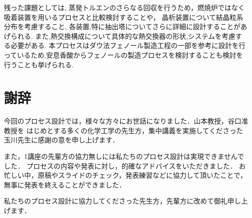 \documentclass[a4j]{jsreport}
\begin{document}
残った課題としては,
蒸発トルエンのさらなる回収を行うため，燃焼炉ではなく吸着装置を用いるプロセスと比較検討することや，
晶析装置について結晶粒系分布を考慮すること,
各装置,特に抽出塔についてさらに詳細に設計することがあげられる.
また,熱交換構成について具体的な熱交換器の形状,システムを考慮する必要がある.
本プロセスはダウ法フェノール製造工程の一部を参考に設計を行っているため,安息香酸からフェノールの製造プロセスを検討することも検討を行うことも挙げられる.


\clearpage
\chapter*{謝辞}
今回のプロセス設計では，様々な方々にお世話になりました．山本教授，谷口准教授を
はじめとする多くの化学工学の先生方，集中講義を実施してくださった玉川先生に感謝の意を申し上げます．

また，1講座の先輩方の協力無しには私たちのプロセス設計は実現できませんでした．
プロセスの内容や発表に対し，的確なアドバイスをいただきました．
お忙しい中，原稿やスライドのチェック，発表練習などに協力して頂いたことで，無事に発表を終えることができました．

私たちのプロセス設計に協力してくださった先生方，先輩方に改めて御礼申し上げます．
\end{document}
